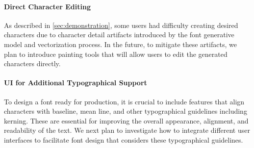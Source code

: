 \paragraph{Direct Character Editing}
As described in \autoref{sec:demonstration}, some users had difficulty creating desired characters due to character detail artifacts introduced by the font generative model and vectorization process.
In the future, to mitigate these artifacts, we plan to introduce painting tools that will allow users to edit the generated characters directly.

\paragraph{UI for Additional Typographical Support}
To design a font ready for production, it is crucial to include features that align characters with baseline, mean line, and other typographical guidelines including kerning.
These are essential for improving the overall appearance, alignment, and readability of the text.
We next plan to investigate how to integrate different user interfaces to facilitate font design that considers these typographical guidelines.
